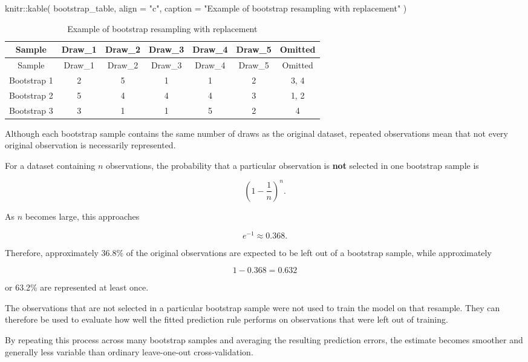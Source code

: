\documentclass[
  letterpaper,
  DIV=11,
  numbers=noendperiod]{scrreprt}
\newenvironment{Shaded}{\begin{snugshade}}{\end{snugshade}}
\newcommand{\AttributeTok}[1]{\textcolor[rgb]{0.40,0.45,0.13}{#1}}
\newcommand{\FunctionTok}[1]{\textcolor[rgb]{0.28,0.35,0.67}{#1}}
\newcommand{\NormalTok}[1]{\textcolor[rgb]{0.00,0.23,0.31}{#1}}
\newcommand{\SpecialCharTok}[1]{\textcolor[rgb]{0.37,0.37,0.37}{#1}}
\newcommand{\StringTok}[1]{\textcolor[rgb]{0.13,0.47,0.30}{#1}}
\begin{document}
\begin{Shaded}
\begin{Highlighting}[]
\NormalTok{knitr}\SpecialCharTok{::}\FunctionTok{kable}\NormalTok{(}
\NormalTok{  bootstrap\_table,}
  \AttributeTok{align =} \StringTok{"c"}\NormalTok{,}
  \AttributeTok{caption =} \StringTok{"Example of bootstrap resampling with replacement"}
\NormalTok{)}
\end{Highlighting}
\end{Shaded}

\begin{longtable}[]{@{}ccccccc@{}}
\caption{Example of bootstrap resampling with
replacement}\tabularnewline
\toprule\noalign{}
Sample & Draw\_1 & Draw\_2 & Draw\_3 & Draw\_4 & Draw\_5 & Omitted \\
\midrule\noalign{}
\endfirsthead
\toprule\noalign{}
Sample & Draw\_1 & Draw\_2 & Draw\_3 & Draw\_4 & Draw\_5 & Omitted \\
\midrule\noalign{}
\endhead
\bottomrule\noalign{}
\endlastfoot
Bootstrap 1 & 2 & 5 & 1 & 1 & 2 & 3, 4 \\
Bootstrap 2 & 5 & 4 & 4 & 4 & 3 & 1, 2 \\
Bootstrap 3 & 3 & 1 & 1 & 5 & 2 & 4 \\
\end{longtable}

Although each bootstrap sample contains the same number of draws as the
original dataset, repeated observations mean that not every original
observation is necessarily represented.

For a dataset containing \(n\) observations, the probability that a
particular observation is \textbf{not} selected in one bootstrap sample
is

\[
\left(1-\frac{1}{n}\right)^n.
\]

As \(n\) becomes large, this approaches

\[
e^{-1} \approx 0.368.
\]

Therefore, approximately 36.8\% of the original observations are
expected to be left out of a bootstrap sample, while approximately

\[
1-0.368=0.632
\]

or 63.2\% are represented at least once.

The observations that are not selected in a particular bootstrap sample
were not used to train the model on that resample. They can therefore be
used to evaluate how well the fitted prediction rule performs on
observations that were left out of training.

By repeating this process across many bootstrap samples and averaging
the resulting prediction errors, the estimate becomes smoother and
generally less variable than ordinary leave-one-out cross-validation.
\end{document}
